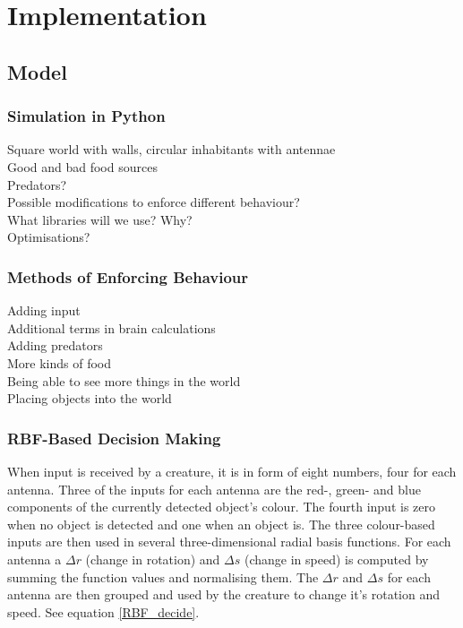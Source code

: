 \documentclass[a4paper,11pt]{kth-mag}
\begin{document}
\chapter{Implementation}
\section{Model}
\subsection{Simulation in Python}
Square world with walls, circular inhabitants with antennae\\
Good and bad food sources\\
Predators?\\
Possible modifications to enforce different behaviour?\\
What libraries will we use? Why?\\
Optimisations?\\

\subsection{Methods of Enforcing Behaviour}
Adding input\\
Additional terms in brain calculations\\
Adding predators\\
More kinds of food\\
Being able to see more things in the world\\
Placing objects into the world\\

\subsection{RBF-Based Decision Making}

When input is received by a creature, it is in form of eight numbers, four for each antenna. Three of the inputs for each antenna are the red-, green- and blue components of the currently detected object's colour. The fourth input is zero when no object is detected and one when an object is. The three colour-based inputs are then used in several three-dimensional radial basis functions. For each antenna a $\Delta r$ (change in rotation) and $\Delta s$ (change in speed) is computed by summing the function values and normalising them. The $\Delta r$ and $\Delta s$ for each antenna are then grouped and used by the creature to change it's rotation and speed. See equation \ref{RBF_decide}.
\end{document}
